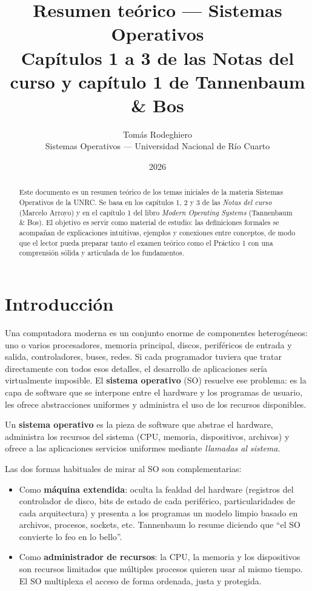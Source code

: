 \documentclass[11pt,a4paper]{article}
\title{
    \vspace{-2.5em}
    \textbf{Resumen teórico --- Sistemas Operativos} \\[0.3em]
    \large Capítulos 1 a 3 de las Notas del curso y capítulo 1 de Tannenbaum \& Bos
}
\author{
    Tomás Rodeghiero \\
    \small Sistemas Operativos --- Universidad Nacional de Río Cuarto
}
\date{2026}
\begin{document}
\maketitle

\begin{abstract}
\noindent
Este documento es un resumen teórico de los temas iniciales de la materia
Sistemas Operativos de la UNRC. Se basa en los capítulos 1, 2 y 3 de las
\emph{Notas del curso} (Marcelo Arroyo) y en el capítulo 1 del libro
\emph{Modern Operating Systems} (Tannenbaum \& Bos). El objetivo es servir
como material de estudio: las definiciones formales se acompañan de
explicaciones intuitivas, ejemplos y conexiones entre conceptos, de modo
que el lector pueda preparar tanto el examen teórico como el Práctico 1
con una comprensión sólida y articulada de los fundamentos.
\end{abstract}

\tableofcontents
\bigskip

\section{Introducción}

Una computadora moderna es un conjunto enorme de componentes
heterogéneos: uno o varios procesadores, memoria principal, discos,
periféricos de entrada y salida, controladores, buses, redes. Si cada
programador tuviera que tratar directamente con todos esos detalles, el
desarrollo de aplicaciones sería virtualmente imposible. El
\textbf{sistema operativo} (SO) resuelve ese problema: es la capa de
software que se interpone entre el hardware y los programas de usuario,
les ofrece abstracciones uniformes y administra el uso de los recursos
disponibles.

\begin{definicion}
Un \textbf{sistema operativo} es la pieza de software que abstrae el
hardware, administra los recursos del sistema (CPU, memoria,
dispositivos, archivos) y ofrece a las aplicaciones servicios uniformes
mediante \emph{llamadas al sistema}.
\end{definicion}

Las dos formas habituales de mirar al SO son complementarias:

\begin{itemize}[leftmargin=*]
    \item Como \textbf{máquina extendida}: oculta la fealdad del
        hardware (registros del controlador de disco, bits de estado de
        cada periférico, particularidades de cada arquitectura) y
        presenta a los programas un modelo limpio basado en archivos,
        procesos, sockets, etc. Tannenbaum lo resume diciendo que ``el
        SO convierte lo feo en lo bello''.
    \item Como \textbf{administrador de recursos}: la CPU, la memoria y
        los dispositivos son recursos limitados que múltiples procesos
        quieren usar al mismo tiempo. El SO multiplexa el acceso de
        forma ordenada, justa y protegida.
\end{itemize}
\end{document}
